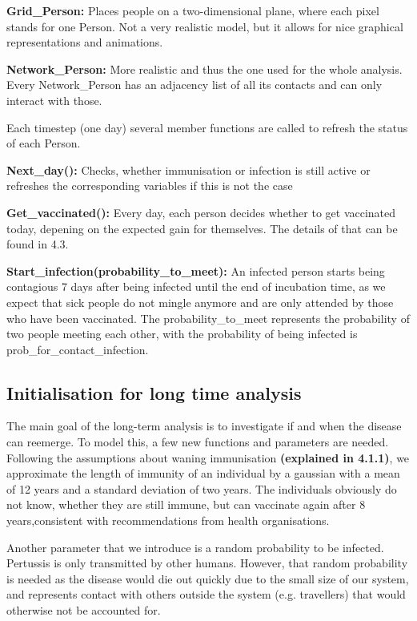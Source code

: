 \documentclass[11pt]{article}
\begin{document}
\textbf{Grid\_Person:} Places people on a two-dimensional plane, where each pixel stands for one Person. Not a very realistic model, but it allows for nice graphical representations and animations.
\vspace{14px}

\textbf{Network\_Person:} More realistic and thus the one used for the whole analysis. Every Network\_Person has an adjacency list of all its contacts and can only interact with those.
\vspace{14px}

Each timestep (one day) several member functions are called to refresh the status of each Person.

\textbf{Next\_day():} Checks, whether immunisation or infection is still active or refreshes the corresponding variables if this is not the case

\textbf{Get\_vaccinated():} Every day, each person decides whether to get vaccinated today, depening on the expected gain for themselves. The details of that can be found in 4.3. 

\textbf{Start\_infection(probability\_to\_meet):} An infected person starts being contagious 7 days after being infected until the end of incubation time, as we expect that sick people do not mingle anymore and are only attended by those who have been vaccinated. The probability\_to\_meet represents the probability of two people meeting each other, with the probability of being infected is prob\_for\_contact\_infection.
\vspace{14px}


\subsection{Initialisation for long time analysis}
The main goal of the long-term analysis is to investigate if and when the disease can reemerge. To model this, a few new functions and parameters are needed. Following the assumptions about waning immunisation \textbf{(explained in 4.1.1)}, we approximate the length of immunity of an individual by a gaussian with a mean of 12 years and a standard deviation of two years. The individuals obviously do not know, whether they are still immune, but can vaccinate again after 8 years,consistent with recommendations from health organisations. 

Another parameter that we introduce is a random probability to be infected. Pertussis is only transmitted by other humans. However, that random probability is needed as the disease would die out quickly due to the small size of our system, and represents contact with others outside the system (e.g. travellers) that would otherwise not be accounted for. 
\end{document}
